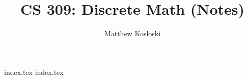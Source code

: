 \documentclass[12pt]{report}
\title{CS 309: Discrete Math (Notes)}
\author{Matthew Kosloski}
\date{ }
\begin{document}
\maketitle
\tableofcontents
{index.tex}
{index.tex}
\end{document}
